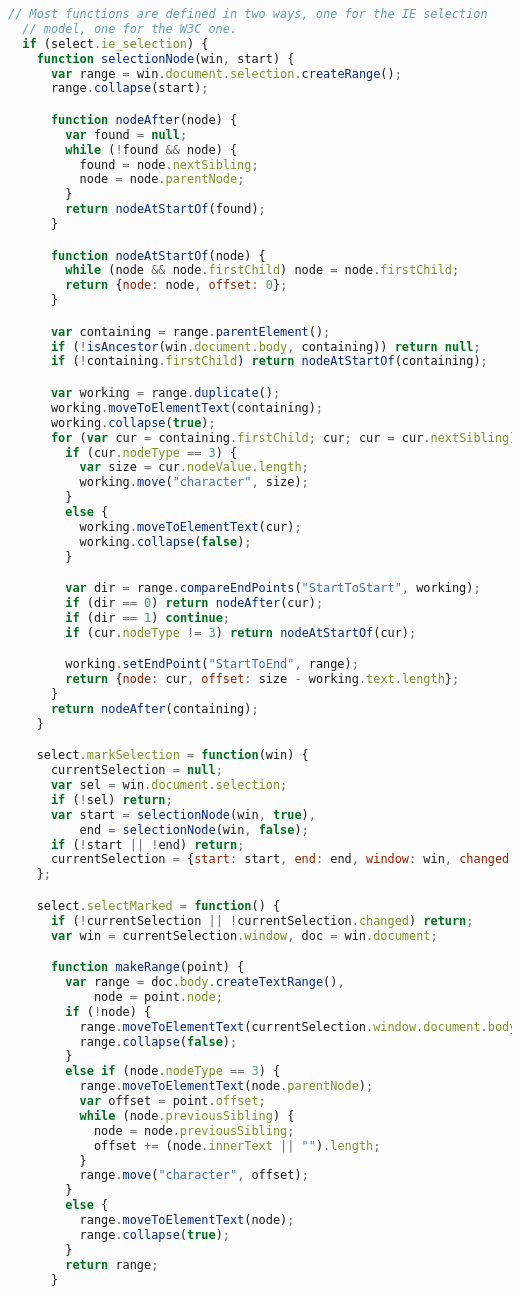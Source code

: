 \begin{lstlisting}[language=Javascript]
  // Most functions are defined in two ways, one for the IE selection
  // model, one for the W3C one.
  if (select.ie_selection) {
    function selectionNode(win, start) {
      var range = win.document.selection.createRange();
      range.collapse(start);

      function nodeAfter(node) {
        var found = null;
        while (!found && node) {
          found = node.nextSibling;
          node = node.parentNode;
        }
        return nodeAtStartOf(found);
      }

      function nodeAtStartOf(node) {
        while (node && node.firstChild) node = node.firstChild;
        return {node: node, offset: 0};
      }

      var containing = range.parentElement();
      if (!isAncestor(win.document.body, containing)) return null;
      if (!containing.firstChild) return nodeAtStartOf(containing);

      var working = range.duplicate();
      working.moveToElementText(containing);
      working.collapse(true);
      for (var cur = containing.firstChild; cur; cur = cur.nextSibling) {
        if (cur.nodeType == 3) {
          var size = cur.nodeValue.length;
          working.move("character", size);
        }
        else {
          working.moveToElementText(cur);
          working.collapse(false);
        }

        var dir = range.compareEndPoints("StartToStart", working);
        if (dir == 0) return nodeAfter(cur);
        if (dir == 1) continue;
        if (cur.nodeType != 3) return nodeAtStartOf(cur);

        working.setEndPoint("StartToEnd", range);
        return {node: cur, offset: size - working.text.length};
      }
      return nodeAfter(containing);
    }

    select.markSelection = function(win) {
      currentSelection = null;
      var sel = win.document.selection;
      if (!sel) return;
      var start = selectionNode(win, true),
          end = selectionNode(win, false);
      if (!start || !end) return;
      currentSelection = {start: start, end: end, window: win, changed: false};
    };

    select.selectMarked = function() {
      if (!currentSelection || !currentSelection.changed) return;
      var win = currentSelection.window, doc = win.document;

      function makeRange(point) {
        var range = doc.body.createTextRange(),
            node = point.node;
        if (!node) {
          range.moveToElementText(currentSelection.window.document.body);
          range.collapse(false);
        }
        else if (node.nodeType == 3) {
          range.moveToElementText(node.parentNode);
          var offset = point.offset;
          while (node.previousSibling) {
            node = node.previousSibling;
            offset += (node.innerText || "").length;
          }
          range.move("character", offset);
        }
        else {
          range.moveToElementText(node);
          range.collapse(true);
        }
        return range;
      }


\end{lstlisting}
